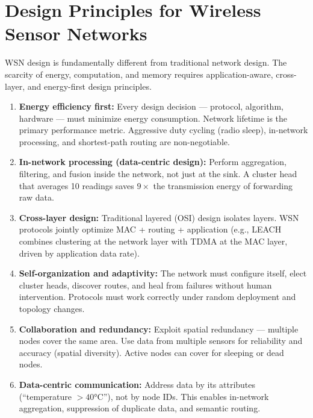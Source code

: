 \documentclass[12pt,a4paper]{article}
\begin{document}
\section{Design Principles for Wireless Sensor Networks}

WSN design is fundamentally different from traditional network design. The scarcity of energy, computation, and memory requires application-aware, cross-layer, and energy-first design principles.

\begin{tcolorbox}[formulabox, title={\textbf{Core WSN Design Principles}}]
\begin{enumerate}[leftmargin=*, itemsep=5pt]
  \item \textbf{Energy efficiency first:} Every design decision --- protocol, algorithm, hardware --- must minimize energy consumption. Network lifetime is the primary performance metric. Aggressive duty cycling (radio sleep), in-network processing, and shortest-path routing are non-negotiable.

  \item \textbf{In-network processing (data-centric design):} Perform aggregation, filtering, and fusion inside the network, not just at the sink. A cluster head that averages 10 readings saves $9\times$ the transmission energy of forwarding raw data.

  \item \textbf{Cross-layer design:} Traditional layered (OSI) design isolates layers. WSN protocols jointly optimize MAC + routing + application (e.g., LEACH combines clustering at the network layer with TDMA at the MAC layer, driven by application data rate).

  \item \textbf{Self-organization and adaptivity:} The network must configure itself, elect cluster heads, discover routes, and heal from failures without human intervention. Protocols must work correctly under random deployment and topology changes.

  \item \textbf{Collaboration and redundancy:} Exploit spatial redundancy --- multiple nodes cover the same area. Use data from multiple sensors for reliability and accuracy (spatial diversity). Active nodes can cover for sleeping or dead nodes.

  \item \textbf{Data-centric communication:} Address data by its attributes (``temperature $> 40$°C''), not by node IDs. This enables in-network aggregation, suppression of duplicate data, and semantic routing.


\end{enumerate}
\end{tcolorbox}
\end{document}
